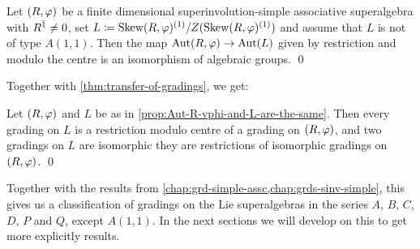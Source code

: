 \begin{prop}\label{prop:Aut-R-vphi-and-L-are-the-same}
    Let $(R, \varphi)$ be a finite dimensional superinvolution-simple associative superalgebra with $R^{\bar1} \neq 0$, set 
    $L \coloneqq \operatorname{Skew}(R, \varphi)^{(1)}/Z( \operatorname{Skew}(R, \varphi)^{(1)} )$ and assume that $L$ is not of type $A(1,1)$. 
    Then the map $\operatorname{Aut}(R, \varphi) \to \operatorname{Aut}(L)$ given by restriction and modulo the centre is an isomorphism of algebraic groups. \qed
\end{prop}

Together with \cref{thm:transfer-of-gradings}, we get:

\begin{cor}\label{cor:transfer-R-vphi-to-L}
    Let $(R, \varphi)$ and $L$ be as in \cref{prop:Aut-R-vphi-and-L-are-the-same}. 
    Then every grading on $L$ is a restriction modulo centre of a grading on $(R, \varphi)$, and two gradings on $L$ are isomorphic \IFF they are restrictions of isomorphic gradings on $(R, \varphi)$. \qed
\end{cor}

Together with the results from \cref{chap:grd-simple-assc,chap:grds-sinv-simple}, this gives us a classification of gradings on the Lie superalgebras in the series $A$, $B$, $C$, $D$, $P$ and $Q$, except $A(1,1)$. 
In the next sections we will develop on this to get more explicitly results.